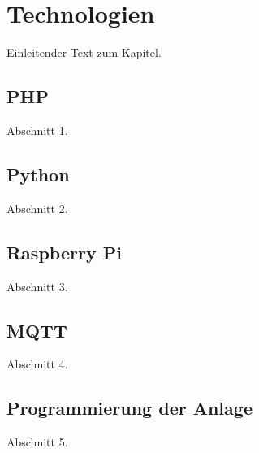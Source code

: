 \chapter{Technologien\label{chap3:Drittes-Kapitel}}

Einleitender Text zum Kapitel.



\section{PHP\label{sec3.1:Unterpunkt-1}}

Abschnitt 1.

\section{Python\label{sec3.2:Unterpunkt-2}}

Abschnitt 2.

\section{Raspberry Pi\label{sec3.3:Unterpunkt-3}}

Abschnitt 3.

\section{MQTT\label{sec3.4:Unterpunkt-4}}

Abschnitt 4.

\section{Programmierung der Anlage\label{sec3.5:Unterpunkt-5}}

Abschnitt 5.